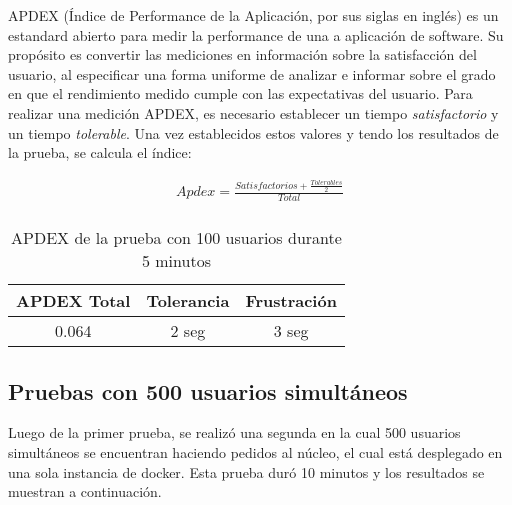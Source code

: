 APDEX (Índice de Performance de la Aplicación, por sus siglas en inglés) es un estandard abierto para medir la performance de una a aplicación de software. Su propósito es convertir las mediciones en información sobre la satisfacción del usuario, al especificar una forma uniforme de analizar e informar sobre el grado en que el rendimiento medido cumple con las expectativas del usuario.
Para realizar una medición APDEX, es necesario establecer un tiempo \emph{satisfactorio} y un tiempo \emph{tolerable}.
Una vez establecidos estos valores y tendo los resultados de la prueba, se calcula el índice:

\begin{align*}
  Apdex = \frac{Satisfactorios + \frac{Tolerables}{2}}{Total}\\
\end{align*}
\break
\begin{table}[!htbp]
    \centering
    \makegapedcells
    \begin{tabular}{|c|c|c}
    \hline
    APDEX Total & Tolerancia & Frustración\\ \hline
    0.064 & 2 seg & 3 seg \\ \hline
    \end{tabular}
    \caption{APDEX de la prueba con 100 usuarios durante 5 minutos}
    \label{tab:tabla_planes}
\end{table}


\break

\subsection{Pruebas con 500 usuarios simultáneos}
Luego de la primer prueba, se realizó una segunda en la cual 500 usuarios simultáneos se encuentran haciendo pedidos al núcleo, el cual está desplegado en una sola instancia de docker.
Esta prueba duró 10 minutos y los resultados se muestran a continuación.

